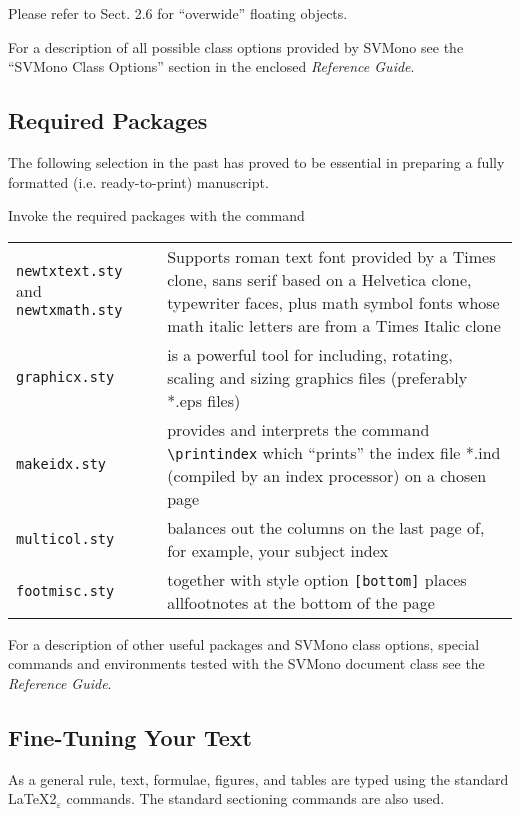 \documentclass[graybox]{svmono}
\begin{document}
Please refer to Sect. 2.6 for ``overwide'' floating objects.

For a description of all possible class options provided by {\sc SVMono} see the ``{\sc SVMono} Class Options'' section in the enclosed {\it Reference Guide}.

\subsection{Required Packages}

The following selection in the past has proved to be essential in preparing a fully formatted (i.e. ready-to-print) manuscript.

\pagebreak

Invoke the required packages with the command

\cprotect\boxtext{\verb|\usepackage{}|}

\begin{tabular}{p{7.5pc}@{\qquad}p{18.5pc}}
{\tt newtxtext.sty} and {\tt newtxmath.sty} & Supports roman text font provided by a Times clone,  sans serif based on a Helvetica clone,  typewriter faces,  plus math symbol fonts whose math italic letters are from a Times Italic clone\\
{\tt graphicx.sty} & is a powerful tool for including, rotating, scaling and sizing graphics files (preferably *.eps files) \\
{\tt makeidx.sty} & provides and interprets the command \verb|\printindex| which ``prints'' the index file *.ind (compiled by an index processor) on a chosen page \\
{\tt multicol.sty} & balances out the columns on the last page of, for exam­ple, your subject index \\
{\tt footmisc.sty} & together with style option {\tt [bottom]} places all\break footnotes at the bottom of the page
\end{tabular}

For a description of other useful packages and {\sc SVMono} class options, special commands and environments tested with the {\sc SVMono} document class see the {\it Reference Guide}.


\subsection{Fine-Tuning Your Text}

 As a general rule, text, formulae, figures, and tables are typed using the standard \LaTeX2$_\varepsilon$ commands. The standard sectioning commands are also used.
\end{document}

